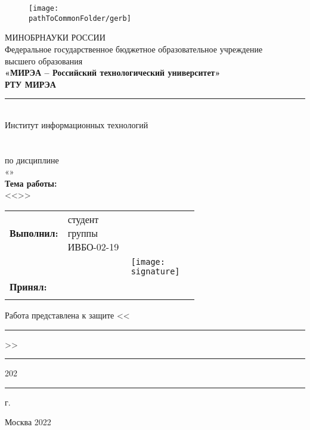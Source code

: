 

\begin{center}
	\begin{figure}[h!]
		\begin{center}
			\vspace{-10ex}
		\texttt{[image: \\pathToCommonFolder/gerb]}
		\end{center}
	\end{figure}
 	\small	МИНОБРНАУКИ РОССИИ \\
	Федеральное государственное бюджетное образовательное учреждение\\
						высшего образования\\
\normalsize					
\textbf{«МИРЭА – Российский технологический университет»\\
						РТУ МИРЭА}\\
						\noindent\rule{1\linewidth}{1pt}\\
       Институт информационных технологий\\ %
					\kafedra\\
		\vspace{3ex}
			\large \textbf{\workname}  \\
						по дисциплине\\ «\discipline» \\
		\vspace{3ex}
		\if \withouttheme
			\textbf{Тема работы:}\\ <<\theme>>
		\fi
\vspace{6ex}
\small
\begin{table}[h!]
\begin{tabular}{lp{0.43\linewidth}p{0.2\linewidth}l}
	\textbf{Выполнил:} & студент группы ИВБО-02-19 & \\ 
	& & %
		\hfill \texttt{[image: \\signature]} &

	 \studentfio \\%
	\textbf{Принял:} & \rang & \\
	& & & \hfill \teacherfio\\
\end{tabular}
\end{table}
\end{center}
\begin{flushleft}
Работа представлена к защите <<\rule{3ex}{1pt}>>\rule{10ex}{1pt} 202\rule{1ex}{1pt} г.\hfill
\end{flushleft}
\normalsize
\begin{center}
	\vfill
Москва 2022
\end{center}
